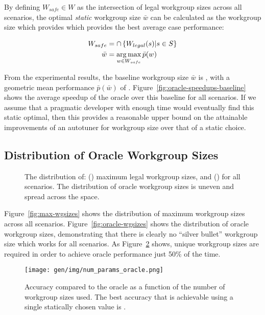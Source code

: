 By defining $W_{safe} \in W$ as the intersection of legal workgroup
sizes across all scenarios, the optimal \emph{static} workgroup size
$\bar{w}$ can be calculated as the workgroup size which provides which
provides the best average case performance:

\begin{align}
W_{safe} &= \cap \left\{ W_{legal}(s) | s \in S \right\}\\
\bar{w} &= \operatorname*{arg\,max}_{w \in W_{safe}} \bar{p}(w)
\end{align}

From the experimental results, the baseline workgroup size $\bar{w}$
is , with a geometric mean performance
$\bar{p}(\bar{w})$ of
. Figure~\ref{fig:oracle-speedups-baseline}
shows the average speedup of the oracle over this baseline for all
scenarios. If we assume that a pragmatic developer with enough time
would eventually find this static optimal, then this provides a
reasonable upper bound on the attainable improvements of an autotuner
for workgroup size over that of a static choice.


\subsection{Distribution of Oracle Workgroup Sizes}

\begin{figure}

\caption{%
  The distribution of: () maximum legal
  workgroup sizes, and () for all
  scenarios. The distribution of oracle workgroup sizes is uneven and
  spread across the space.%
}
\label{fig:heatmaps}
\end{figure}

Figure~\ref{fig:max-wgsizes} shows the distribution of maximum
workgroup sizes across all scenarios. Figure~\ref{fig:oracle-wgsizes}
shows the distribution of oracle workgroup sizes, demonstrating that
there is clearly no ``silver bullet'' workgroup size which works for
all scenarios. As Figure~\ref{fig:oracle-accuracy} shows,
 unique workgroup sizes are
required in order to achieve oracle performance just 50\% of the time.

\begin{figure}
\centering
\texttt{[image: gen/img/num\_params\_oracle.png]}
\caption{%
  Accuracy compared to the oracle as a function of the number of
  workgroup sizes used. The best accuracy that is achievable using a
  single statically chosen value is
  \protect.%
}
\label{fig:oracle-accuracy}
\end{figure}

